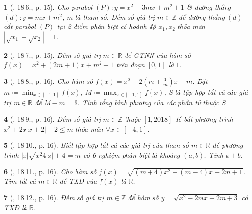 \documentclass{article}
\newtheorem{baitoan}{}
\begin{document}
\begin{baitoan}[\cite{Hai_Hung_Thu_Tung_ncpt_Toan_10_tap_2}, 18.6., p. 15]
	Cho parabol $(P):y = x^2 - 3mx + m^2 + 1$ \& đường thẳng $(d):y = mx + m^2$, $m$ là tham số. Đếm số giá trị $m\in\mathbb{Z}$ để đường thẳng $(d)$ cắt parabol $(P)$ tại 2 điểm phân biệt có hoành độ $x_1,x_2$ thỏa mãn $|\sqrt{x_1} - \sqrt{x_2}| = 1$.
\end{baitoan}

\begin{baitoan}[\cite{Hai_Hung_Thu_Tung_ncpt_Toan_10_tap_2}, 18.7., p. 15]
	Đếm số giá trị $m\in\mathbb{R}$ để {\rm GTNN} của hàm số $f(x) = x^2 + (2m + 1)x + m^2 - 1$ trên đoạn $[0,1]$ là $1$.
\end{baitoan}

\begin{baitoan}[\cite{Hai_Hung_Thu_Tung_ncpt_Toan_10_tap_2}, 18.8., p. 16]
	Cho hàm số $f(x) = x^2 - 2\left(m + \frac{1}{m}\right)x + m$. Đặt $m\coloneqq\min_{x\in[-1,1]} f(x)$, $M\coloneqq\max_{x\in[-1,1]} f(x)$, $S$ là tập hợp tất cả các giá trị $m\in\mathbb{R}$ để $M - m = 8$. Tính tổng bình phương của các phần tử thuộc $S$.
\end{baitoan}

\begin{baitoan}[\cite{Hai_Hung_Thu_Tung_ncpt_Toan_10_tap_2}, 18.9., p. 16]
	Đếm số giá trị $m\in\mathbb{Z}$ thuộc $[1,2018]$ để bất phương trình $x^2 + 2x|x + 2| - 2\le m$ thỏa mãn $\forall x\in[-4,1]$.
\end{baitoan}

\begin{baitoan}[\cite{Hai_Hung_Thu_Tung_ncpt_Toan_10_tap_2}, 18.10., p. 16]
	Biết tập hợp tất cả các giá trị của tham số $m\in\mathbb{R}$ để phương trình $|x|\sqrt{x^2  4|x| + 4} = m$ có 6 nghiệm phân biệt là khoảng $(a,b)$. Tính $a + b$.
\end{baitoan}

\begin{baitoan}[\cite{Hai_Hung_Thu_Tung_ncpt_Toan_10_tap_2}, 18.11., p. 16]
	Cho hàm số $f(x) = \sqrt{(m + 4)x^2 - (m - 4)x - 2m + 1}$. Tìm tất cả $m\in\mathbb{R}$ để {\rm TXĐ} của $f(x)$ là $\mathbb{R}$.
\end{baitoan}

\begin{baitoan}[\cite{Hai_Hung_Thu_Tung_ncpt_Toan_10_tap_2}, 18.12., p. 16]
	Đếm số giá trị $m\in\mathbb{Z}$ để hàm số $y = \sqrt{x^2 - 2mx - 2m + 3}$ có {\rm TXĐ} là $\mathbb{R}$.
\end{baitoan}
\end{document}
